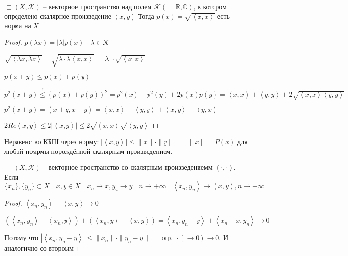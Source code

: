 \documentclass{book}
\newcommand\R{\ensuremath{\mathbb{R}}}
\renewcommand\C{\ensuremath{\mathbb{C}}}
\newcommand{\ov}[1]{\overline{#1}}
\theoremstyle{definition}
\begin{document}
\begin{statement}
    $\sqsupset (X, \mathcal{K})$ -- векторное пространство над полем $\mathcal{K}( = \R, \C)$, в котором определено скалярное произведение $ \left< x, y \right>$ Тогда $p(x) = \sqrt{\left< x, x \right>} $ есть норма на $X$
\end{statement}
\begin{proof}
    $p(\lambda x) = |\lambda|p(x)\quad \lambda \in \mathcal{K}$

    $\sqrt{\left< \lambda x, \lambda x \right>} = \sqrt{\lambda \cdot  \ov{\lambda} \left< x, x \right>}  = |\lambda| \cdot \sqrt{\left< x, x \right>} $

    $p(x+y)\leqslant p(x) + p(y)$

    $p^2(x+y) \overset ? {\leqslant } (p(x) + p(y))^2 = p^2(x) + p^2(y) + 2p(x)p(y) = \left< x, x \right> + \left< y, y \right> + 2\sqrt{\left< x, x \right> \left< y, y \right>} $

    $p^2(x+y) = \left< x+y, x+y \right> = \left< x, x \right> + \left< y, y \right> + \left< x, y  \right> + \left< y, x \right>$

    $2 Re\left<x, y \right> \leqslant 2 \left| \left< x,y \right> \right| \leqslant 2\sqrt{\left< x, x \right>} \sqrt{\left< y, y \right>} $
\end{proof}

Неравенство КБШ через норму: $\left| \left< x, y \right> \right| \leqslant \|x\| \cdot \|y\|\qquad \|x\| = P(x)$ для любой номрмы порождённой скалярным произведением.

\begin{statement}
    $\sqsupset \left( X, \mathcal{K} \right) $ -- векторное пространство со скалярным произведениемм $\left<\cdot , \cdot  \right>.$ Если  $\{x_{n} \}, \{y_{n} \} \subset X\quad x, y\in X\quad x_{n} \to x, y_{n} \to y\quad n \to  +\infty \quad \left<x_{n} , y_{n}  \right> \to \left< x, y \right>, n\to  +\infty $
\end{statement}
\begin{proof}
    $\left< x_{n} , y_{n}  \right> - \left< x, y \right> \to 0$

    $\left( \left<x_{n} , y_{n}  \right> - \left<x_{n} , y \right> \right)  + \left( \left< x_{n} , y \right> - \left< x, y \right> \right)  = \left< x_{n} , y_{n} -y \right> + \left< x_{n} -x, y_{n}  \right> \to 0$

    Потому что $\left| \left< x_{n} , y_{n} -y \right> \right| \leqslant \|x_{n} \|\cdot \|y_{n} -y\| =  \text{ огр. } \cdot  (\to 0) \to 0$. И аналогично со второым

    
\end{proof}
\end{document}

